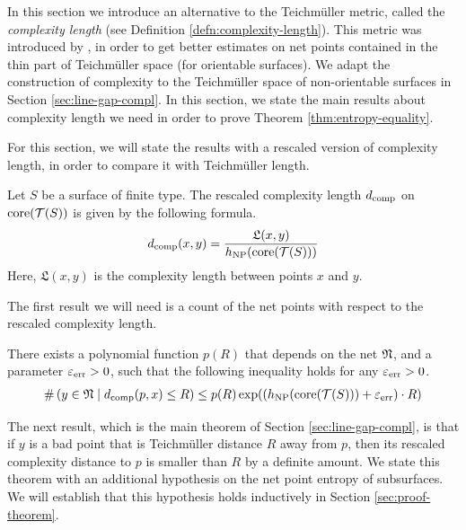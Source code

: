 \documentclass[12pt, reqno]{amsart}
\begin{document}
In this section we introduce an alternative to the Teichmüller metric, called the \emph{complexity length} (see Definition \ref{defn:complexity-length}).
This metric was introduced by \textcite{dowdall2023lattice}, in order to get better estimates on net points contained in the thin part of Teichmüller space (for orientable surfaces).
We adapt the construction of complexity to the Teichmüller space of non-orientable surfaces in Section \ref{sec:line-gap-compl}.
In this section, we state the main results about complexity length we need in order to prove Theorem \ref{thm:entropy-equality}.

For this section, we will state the results with a rescaled version of complexity length, in order to compare it with Teichmüller length.

\begin{definition}
  Let $S$ be a surface of finite type.
  The rescaled complexity length $d_{\mathrm{comp}}$ on $\mathrm{core}(\mathcal{T}(S))$ is given by the following formula.
  \begin{align*}
    d_{\mathrm{comp}}(x, y) = \frac{\mathfrak{L}(x,y)}{h_{\mathrm{NP}}(\mathrm{core}(\mathcal{T}(S)))}
  \end{align*}
  Here, $\mathfrak{L}(x,y)$ is the complexity length between points $x$ and $y$.
\end{definition}

The first result we will need is a count of the net points with respect to the rescaled complexity length.

\begin{theorem}
  \label{thm:counting-with-complexity-rescaled}
  There exists a polynomial function $p(R)$ that depends on the net $\mathfrak{N}$, and a parameter $\varepsilon_{\mathrm{err}} > 0$, such that the following inequality holds for any $\varepsilon_{\mathrm{err}} > 0$.
  \begin{align*}
    \#\left( y \in \mathfrak{N} \mid d_{\mathrm{comp}}(p, x) \leq R \right) \leq p(R) \exp((h_{\mathrm{NP}}(\mathrm{core}(\mathcal{T}(S))) + \varepsilon_{\mathrm{err}}) \cdot R)
  \end{align*}
\end{theorem}

The next result, which is the main theorem of Section \ref{sec:line-gap-compl}, is that if $y$ is a bad point that is Teichmüller distance $R$ away from $p$, then its rescaled complexity distance to $p$ is smaller than $R$ by a definite amount.
We state this theorem with an additional hypothesis on the net point entropy of subsurfaces.
We will establish that this hypothesis holds inductively in Section \ref{sec:proof-theorem}.
\end{document}
